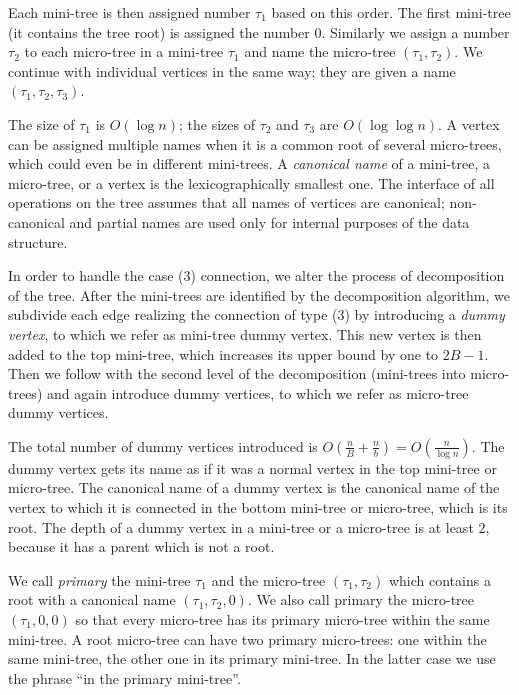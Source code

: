 Each mini-tree is then assigned number $\tau_1$ based on this order.
The first mini-tree (it contains the tree root) is assigned the number $0$.
Similarly we assign a number $\tau_2$ to each micro-tree in a mini-tree $\tau_1$ and name the micro-tree $(\tau_1, \tau_2)$.
We continue with individual vertices in the same way; they are given a name $(\tau_1, \tau_2, \tau_3)$.

The size of $\tau_1$ is $O(\log n)$; the sizes of $\tau_2$ and $\tau_3$ are $O(\log \log n)$.
A vertex can be assigned multiple names when it is a common root of several micro-trees, which could even be in different mini-trees.
A \emph{canonical name} of a mini-tree, a micro-tree, or a vertex is the lexicographically smallest one.
The interface of all operations on the tree assumes that all names of vertices are canonical; non-canonical and partial names are used only for internal purposes of the data structure.

In order to handle the case (3) connection, we alter the process of decomposition of the tree.
After the mini-trees are identified by the decomposition algorithm, we subdivide each edge realizing the connection of type (3) by introducing a \emph{dummy vertex}, to which we refer as mini-tree dummy vertex.
This new vertex is then added to the top mini-tree, which increases its upper bound by one to $2 B - 1$.
Then we follow with the second level of the decomposition (mini-trees into micro-trees) and again introduce dummy vertices, to which we refer as micro-tree dummy vertices.

The total number of dummy vertices introduced is $O\left(\frac{n}{B} + \frac{n}{b}\right) = O\left(\frac{n}{\log n}\right)$.
The dummy vertex gets its name as if it was a normal vertex in the top mini-tree or micro-tree.
The canonical name of a dummy vertex is the canonical name of the vertex to which it is connected in the bottom mini-tree or micro-tree, which is its root.
The depth of a dummy vertex in a mini-tree or a micro-tree is at least $2$, because it has a parent which is not a root.

\bigbreak

We call \emph{primary} the mini-tree $\tau_1$ and the micro-tree $(\tau_1, \tau_2)$ which contains a root with a canonical name $(\tau_1, \tau_2, 0)$.
We also call primary the micro-tree $(\tau_1, 0, 0)$ so that every micro-tree has its primary micro-tree within the same mini-tree.
A root micro-tree can have two primary micro-trees: one within the same mini-tree, the other one in its primary mini-tree.
In the latter case we use the phrase ``in the primary mini-tree''.

